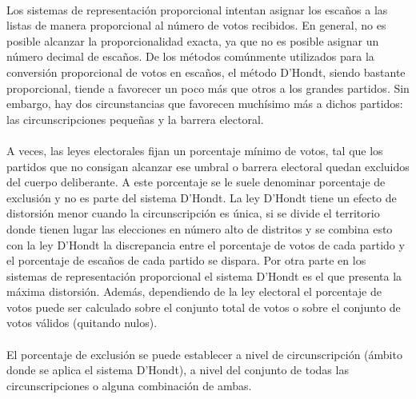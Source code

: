 \documentclass{article}
\begin{document}
    	\paragraph{}
		Los sistemas de representación proporcional intentan asignar los escaños a las listas de manera proporcional al número de votos recibidos. En general, no es posible alcanzar la proporcionalidad exacta, ya que no es posible asignar un número decimal de escaños. De los métodos comúnmente utilizados para la conversión proporcional de votos en escaños, el método D'Hondt, siendo bastante proporcional, tiende a favorecer un poco más que otros a los grandes partidos. Sin embargo, hay dos circunstancias que favorecen muchísimo más a dichos partidos: las circunscripciones pequeñas y la barrera electoral. \cite{wikipedia:dhondt}
        
        \paragraph{}
        A veces, las leyes electorales fijan un porcentaje mínimo de votos, tal que los partidos que no consigan alcanzar ese umbral o barrera electoral quedan excluidos del cuerpo deliberante. A este porcentaje se le suele denominar porcentaje de exclusión y no es parte del sistema D'Hondt. La ley D'Hondt tiene un efecto de distorsión menor cuando la circunscripción es única, si se divide el territorio donde tienen lugar las elecciones en número alto de distritos y se combina esto con la ley D'Hondt la discrepancia entre el porcentaje de votos de cada partido y el porcentaje de escaños de cada partido se dispara. Por otra parte en los sistemas de representación proporcional el sistema D'Hondt es el que presenta la máxima distorsión. Además, dependiendo de la ley electoral el porcentaje de votos puede ser calculado sobre el conjunto total de votos o sobre el conjunto de votos válidos (quitando nulos). \cite{wikipedia:dhondt}
        
        \paragraph{}
        El porcentaje de exclusión se puede establecer a nivel de circunscripción (ámbito donde se aplica el sistema D'Hondt), a nivel del conjunto de todas las circunscripciones o alguna combinación de ambas. \cite{wikipedia:dhondt}
\end{document}
